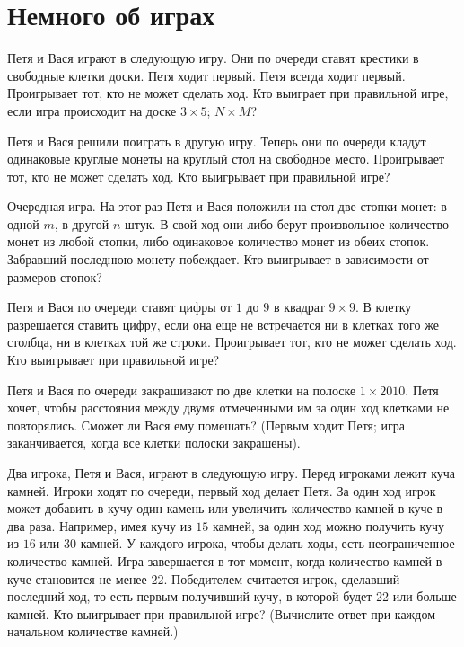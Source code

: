 

\section*{Немного об играх}


\begin{problems}

\item
Петя и Вася играют в следующую игру.
Они по очереди ставят крестики в свободные клетки доски.
Петя ходит первый.
Петя всегда ходит первый.
Проигрывает тот, кто не может сделать ход.
Кто выиграет при правильной игре, если игра происходит на доске
\quad
\sbp $3 \times 5$;
\quad
\sbp $N \times M$?

\item
Петя и Вася решили поиграть в другую игру.
Теперь они по очереди кладут одинаковые круглые монеты на круглый стол на
свободное место.
Проигрывает тот, кто не может сделать ход.
Кто выигрывает при правильной игре?

\item
Очередная игра.
На этот раз Петя и Вася положили на стол две стопки монет:
в одной $m$, в другой $n$ штук.
В свой ход они либо берут произвольное количество монет из любой стопки, либо
одинаковое количество монет из обеих стопок.
Забравший последнюю монету побеждает.
Кто выигрывает в зависимости от размеров стопок?

\item
Петя и Вася по очереди ставят цифры от $1$ до $9$ в квадрат $9 \times 9$.
В клетку разрешается ставить цифру, если она еще не встречается ни в клетках
того же столбца, ни в клетках той же строки.
Проигрывает тот, кто не может сделать ход.
Кто выигрывает при правильной игре?

\item
Петя и Вася по очереди закрашивают по две клетки на полоске $1 \times 2010$.
Петя хочет, чтобы расстояния между двумя отмеченными им за один ход клетками не
повторялись.
Сможет ли Вася ему помешать?
(Первым ходит Петя; игра заканчивается, когда все клетки полоски закрашены).

\item
Два игрока, Петя и Вася, играют в следующую игру.
Перед игроками лежит куча камней. 
Игроки ходят по очереди, первый ход делает Петя.
За один ход игрок может добавить в кучу один камень или увеличить количество
камней в куче в два раза.
Например, имея кучу из $15$ камней, за один ход можно получить кучу из $16$ или
$30$ камней.
У каждого игрока, чтобы делать ходы, есть неограниченное количество камней.
Игра завершается в тот момент, когда количество камней в куче становится не
менее $22$.
Победителем считается игрок, сделавший последний ход, то есть первым получивший
кучу, в которой будет 22 или больше камней.
Кто выигрывает при правильной игре?
(Вычислите ответ при каждом начальном количестве камней.)


\end{problems}
